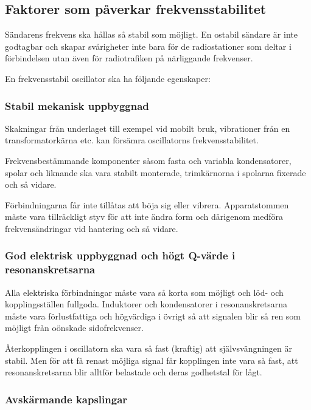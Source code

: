 \subsection{Faktorer som påverkar frekvensstabilitet}

Sändarens frekvens ska hållas så stabil som möjligt.
En ostabil sändare är inte godtagbar och skapar svårigheter inte bara för de
radiostationer som deltar i förbindelsen utan även för radiotrafiken
på närliggande frekvenser.

En frekvensstabil oscillator ska ha följande egenskaper:

\subsubsection{Stabil mekanisk uppbyggnad}

Skakningar från underlaget till exempel vid mobilt bruk, vibrationer från en
transformatorkärna etc. kan försämra oscillatorns frekvensstabilitet.

Frekvensbestämmande komponenter såsom fasta och variabla kondensatorer, spolar
och liknande ska vara stabilt monterade, trimkärnorna i spolarna fixerade och 
så vidare.

Förbindningarna får inte tillåtas att böja sig eller vibrera.
Apparatstommen måste vara tillräckligt styv för att inte ändra form och
därigenom medföra frekvensändringar vid hantering och så vidare.

\subsubsection{God elektrisk uppbyggnad och högt Q-värde i resonanskretsarna}

Alla elektriska förbindningar måste vara så korta som möjligt och löd- och
kopplingsställen fullgoda.
Induktorer och kondensatorer i resonanskretsarna måste vara förlustfattiga
och högvärdiga i övrigt så att signalen blir så ren som möjligt från oönskade
sidofrekvenser.

Återkopplingen i oscillatorn ska vara så fast (kraftig) att självsvängningen
är stabil.
Men för att få renast möjliga signal får kopplingen inte vara så fast,
att resonanskretsarna blir alltför belastade och deras godhetstal för lågt.

\subsubsection{Avskärmande kapslingar}

